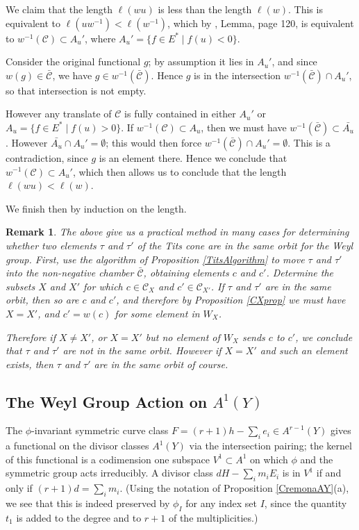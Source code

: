 \documentclass[12pt]{article}
\numberwithin{equation}{section}
\newtheorem{remark}[equation]{Remark}
\numberwithin{equation}{section}
\numberwithin{subeq}{equation}
\def\calC{\mathcal{C}}
\begin{document}
We claim that the length $\ell(w u)$ is less than the length $\ell(w)$.
This is equivalent to $\ell(u w^{-1}) < \ell(w^{-1})$,
which by \cite{Humphreys}, Lemma, page 120,
is equivalent to $w^{-1}(\mathcal{C}) \subset A_u'$,
where $A_u' = \{f \in E^* \;|\; f(u) < 0\}$.

Consider the original functional $g$; by assumption it lies in $A_u'$,
and since $w(g) \in \bar{\mathcal{C}}$,
we have $g \in w^{-1}(\bar{\mathcal{C}})$.
Hence $g$ is in the intersection $w^{-1}(\bar{\mathcal{C}}) \cap A_u'$,
so that intersection is not empty.

However any translate of $\mathcal{C}$ is fully contained in either $A_u'$
or $A_u = \{f \in E^* \;|\; f(u) > 0\}$.
If $w^{-1}(\mathcal{C}) \subset A_u$, 
then we must have $w^{-1}(\bar{\mathcal{C}}) \subset \bar{A_u}$.
However $\bar{A_u} \cap A_u' = \emptyset$;
this would then force
$w^{-1}(\bar{\mathcal{C}}) \cap A_u' = \emptyset$.
This is a contradiction, since $g$ is an element there.
Hence we conclude that $w^{-1}(\mathcal{C}) \subset A_u'$,
which then allows us to conclude that the length $\ell(wu) < \ell(w)$.

We finish then by induction on the length.


\begin{remark}\label{Worbitcheck}
The above give us a practical method in many cases for determining
whether two elements $\tau$ and $\tau'$ of the Tits cone
are in the same orbit for the Weyl group.
First, use the algorithm of Proposition \ref{TitsAlgorithm}
to move $\tau$ and $\tau'$ into the non-negative chamber $\bar{\calC}$,
obtaining elements $c$ and $c'$.
Determine the subsets $X$ and $X'$
for which $c \in \calC_X$ and $c' \in \calC_{X'}$.
If $\tau$ and $\tau'$ are in the same orbit,
then so are $c$ and $c'$,
and therefore by Proposition \ref{CXprop} we must have $X=X'$,
and $c' = w(c)$ for some element in $W_X$.

Therefore if $X \neq X'$,
or $X=X'$ but no element of $W_X$ sends $c$ to $c'$,
we conclude that $\tau$ and $\tau'$ are not in the same orbit.
However if $X=X'$ and such an element exists,
then $\tau$ and $\tau'$ are  in the same orbit of course.
\end{remark}

\subsection{The Weyl Group Action on $A^1(Y)$}
The $\phi$-invariant symmetric curve class $F = (r+1)h - \sum_i e_i  \in A^{r-1}(Y)$
gives a functional on the divisor classes $A^1(Y)$
via the intersection pairing;
the kernel of this functional is a codimension one subspace $V^1 \subset A^1$
on which $\phi$ and the symmetric group acts irreducibly.
A divisor class $dH-\sum_i m_i E_i$ is in $V^1$ if and only if $(r+1)d = \sum_i m_i$.
(Using the notation of Proposition \ref{CremonaAY}(a),
we see that this is indeed preserved by $\phi_I$ for any index set $I$,
since the quantity $t_1$ is added to the degree and to $r+1$ of the multiplicities.)
\end{document}
